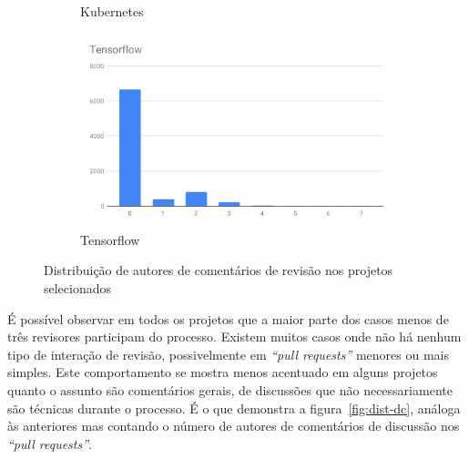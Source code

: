 \documentclass[12pt,openany,oneside,a4paper,english,brazil]{abntbibufjf}
\begin{document}
\begin{figure}[htbp]
\begin{subfigure}[b]{0.475\textwidth}
         \caption[Kubernetes]%
         {{\small Kubernetes}}
         \label{fig:dist-rc-kubernetes}
     \end{subfigure}
     \quad
     \begin{subfigure}[b]{0.475\textwidth}
         \centering
         \includegraphics[width=\textwidth]{resultados/dist-rc-tensorflow}
         \caption[Tensorflow]%
         {{\small Tensorflow}}
         \label{fig:dist-rc-tensorflow}
     \end{subfigure}
     \caption[]
     {\small Distribuição de autores de comentários de revisão nos projetos selecionados}
     \label{fig:dist-rc}
 \end{figure}

  É possível observar em todos os projetos que a maior parte dos casos menos de três revisores participam do processo. Existem muitos casos onde não há nenhum tipo de interação de revisão, possivelmente em \textit{``pull requests''} menores ou mais simples. Este comportamento se mostra menos acentuado em alguns projetos quanto o assunto são comentários gerais, de discussões que não necessariamente são técnicas durante o processo. É o que demonstra a figura~\ref{fig:dist-dc}, análoga às anteriores mas contando o número de autores de comentários de discussão nos \textit{``pull requests''}.
\end{document}
